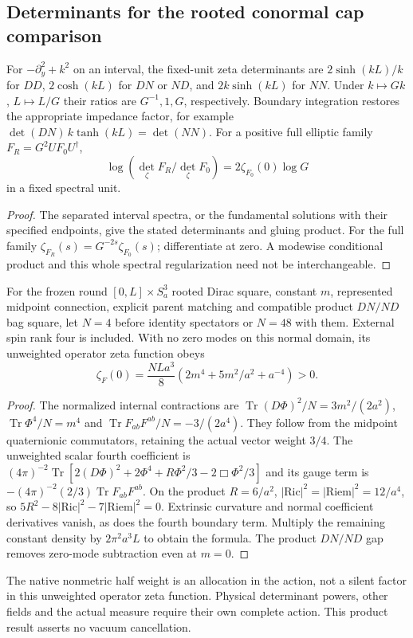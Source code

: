 \documentclass[11pt,a4paper]{article}
\begin{document}
\subsection{Determinants for the rooted conormal cap comparison}
\label{p3g:sec:v241-rooted-determinants}
\begin{proposition}
\label{p3f:prop:v229-determinant-scope}
For $-\partial_y^2+k^2$ on an interval, the fixed-unit zeta determinants
are $2\sinh(kL)/k$ for $DD$, $2\cosh(kL)$ for $DN$ or $ND$, and
$2k\sinh(kL)$ for $NN$. Under $k\mapsto Gk$, $L\mapsto L/G$ their
ratios are $G^{-1},1,G$, respectively. Boundary integration restores
the appropriate impedance factor, for example
$\det(DN)\,k\tanh(kL)=\det(NN)$.
For a positive full elliptic family $F_R=G^2UF_0U^\dagger$,
\[
 \log(\det_\zeta F_R/\det_\zeta F_0)=2\zeta_{F_0}(0)\log G
\]
in a fixed spectral unit.
\end{proposition}
\begin{proof}
The separated interval spectra, or the fundamental solutions with their
specified endpoints, give the stated determinants and gluing product.
For the full family $\zeta_{F_R}(s)=G^{-2s}\zeta_{F_0}(s)$;
differentiate at zero. A modewise conditional product and this whole
spectral regularization need not be interchangeable.
\end{proof}

\begin{proposition}
\label{p3f:prop:v229-rooted-product-zeta}
For the frozen round $[0,L]\times S^3_a$ rooted Dirac square, constant
$m$, represented midpoint connection, explicit parent matching and
compatible product $DN/ND$ bag square, let $N=4$ before identity
spectators or $N=48$ with them. External spin rank four is included.
With no zero modes on this normal domain, its unweighted operator zeta
function obeys
\[
 \zeta_F(0)=\frac{NLa^3}{8}
 (2m^4+5m^2/a^2+a^{-4})>0.
\]
\end{proposition}
\begin{proof}
The normalized internal contractions are
$\operatorname{Tr}(D\Phi)^2/N=3m^2/(2a^2)$,
$\operatorname{Tr}\Phi^4/N=m^4$ and
$\operatorname{Tr}F_{ab}F^{ab}/N=-3/(2a^4)$.
They follow from the midpoint quaternionic commutators, retaining the
actual vector weight $3/4$. The unweighted scalar fourth coefficient
is $(4\pi)^{-2}\operatorname{Tr}[2(D\Phi)^2+2\Phi^4+
R\Phi^2/3-2\Box\Phi^2/3]$ and its gauge term is
$-(4\pi)^{-2}(2/3)\operatorname{Tr}F_{ab}F^{ab}$.
On the product $R=6/a^2$, $|\mathrm{Ric}|^2=|\mathrm{Riem}|^2=12/a^4$,
so $5R^2-8|\mathrm{Ric}|^2-7|\mathrm{Riem}|^2=0$.
Extrinsic curvature and normal coefficient derivatives vanish, as does
the fourth boundary term. Multiply the remaining constant density by
$2\pi^2a^3L$ to obtain the formula. The product $DN/ND$ gap removes
zero-mode subtraction even at $m=0$.
\end{proof}
The native nonmetric half weight is an allocation in the action, not
a silent factor in this unweighted operator zeta function. Physical
determinant powers, other fields and the actual measure require their
own complete action. This product result asserts no vacuum cancellation.
\end{document}
